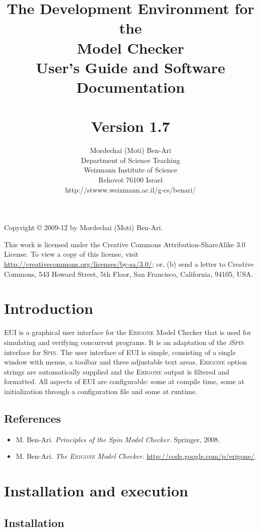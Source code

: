 \documentclass[11pt]{article}
\title{The \eui{} Development Environment for the\\
\eri{} Model Checker\\User's Guide and Software Documentation\\
\mbox{}\\\large{Version 1.7}}       %
\author{Mordechai (Moti) Ben-Ari\\
Department of Science Teaching\\
Weizmann Institute of Science\\
Rehovot 76100 Israel\\
\textsf{http://stwww.weizmann.ac.il/g-cs/benari/}}
\newcommand{\eri}{\textsc{Erigone}}
\newcommand{\eui}{\textsc{EUI}}
\begin{document}
\maketitle
\thispagestyle{empty}

\vfill

\begin{center}
Copyright \copyright{} 2009-12 by Mordechai (Moti) Ben-Ari.
\end{center}

This work is licensed under the Creative Commons Attribution-ShareAlike 3.0
License. To view a copy of this license, visit
\url{http://creativecommons.org/licenses/by-sa/3.0/}; or, (b) send a letter
to Creative Commons, 543 Howard Street, 5th Floor, San Francisco,
California, 94105, USA.

\newpage

\section{Introduction}

\eui{} is a graphical user interface for the \eri{} Model Checker that
is used for simulating and verifying concurrent programs. It is an
adaptation of the \textsc{jSpin} interface for \textsc{Spin}. The user
interface of \eui{} is simple, consisting of a single window with menus,
a toolbar and three adjustable text areas. \eri{} option strings are
automatically supplied and the \eri{} output is filtered and formatted.
All aspects of \eui{} are configurable: some at compile time, some at
initialization through a configuration file and some at runtime.

\subsection*{References}
\begin{itemize}
\item M. Ben-Ari. \textit{Principles of the Spin Model Checker}. Springer, 2008.
\item M. Ben-Ari. \textit{The \eri{} Model Checker}. \url{http://code.google.com/p/erigone/}.
\end{itemize}

\section{Installation and execution}

\subsection{Installation}
\end{document}
